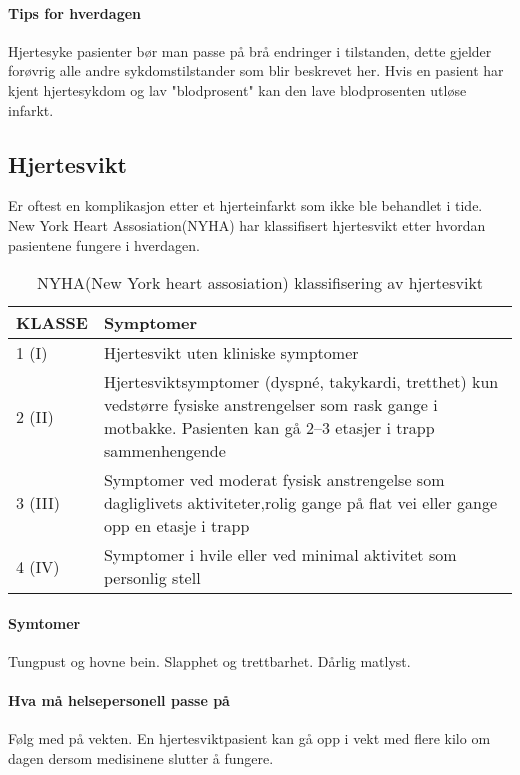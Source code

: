 				\paragraph{Tips for hverdagen\\}
					Hjertesyke pasienter bør man passe på brå endringer i tilstanden, dette gjelder forøvrig alle andre sykdomstilstander som blir beskrevet her. Hvis en pasient har kjent hjertesykdom og lav "blodprosent" kan den lave blodprosenten utløse infarkt.
			\subsection{Hjertesvikt}
				Er oftest en komplikasjon etter et hjerteinfarkt som ikke ble behandlet i tide. New York Heart Assosiation(NYHA) har klassifisert hjertesvikt etter hvordan pasientene fungere i hverdagen. 
					\begin{table}[ht]
						\caption{NYHA(New York heart assosiation) klassifisering av hjertesvikt}
						\centering
						\begin{tabular}{|p{2cm}| p{11cm}|}
							\hline
							\textbf{KLASSE} & \textbf{Symptomer}\\[0.75pt]
							\hline
							1 (I) & Hjertesvikt uten kliniske symptomer\\
							\hline
							2 (II) & Hjertesviktsymptomer (dyspné, takykardi, tretthet) kun ved\newline større fysiske anstrengelser som rask gange i motbakke. \newline Pasienten kan gå 2–3 etasjer i trapp sammenhengende\\
							\hline
							3 (III) & Symptomer ved moderat fysisk anstrengelse som dagliglivets aktiviteter,\newline rolig gange på flat vei eller gange opp en etasje i trapp\\
							\hline
							4 (IV) & Symptomer i hvile eller ved minimal aktivitet som personlig stell \\
							\hline
						\end{tabular}
					\end{table}
				\paragraph{Symtomer\\}
					Tungpust og hovne bein. Slapphet og trettbarhet. Dårlig matlyst.
				\paragraph{Hva må helsepersonell passe på\\}
					Følg med på vekten. En hjertesviktpasient kan gå opp i vekt med flere kilo om dagen dersom medisinene slutter å fungere. 
